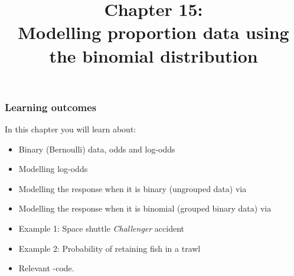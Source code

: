 \documentclass{beamer}\usepackage[]{graphicx}\usepackage[]{xcolor}
\begin{document}
\newcommand{\thechapter}{15}


\newcommand{\cmark}{\ding{51}}
\newcommand{\xmark}{\ding{55}}


\title{Chapter \thechapter: \\ Modelling proportion data using the binomial distribution}






\begin{frame}
\titlepage
\end{frame}


\begin{frame}[t]
\frametitle{Learning outcomes}
In this chapter you will learn about:
\begin{center}
\vspace{16pt}
\begin{minipage}{0.9\textwidth}
  \begin{itemize}
    \item Binary (Bernoulli) data, odds and log-odds
    \item Modelling log-odds
    \item Modelling the response when it is binary (ungrouped data) via 
    \item Modelling the response when it is binomial (grouped binary data) via 
    \item Example 1: Space shuttle {\em Challenger} accident
    \item Example 2: Probability of retaining fish in a trawl
    \item Relevant -code.
  \end{itemize}
\end{minipage}
\end{center}
\end{frame}



\end{document}
